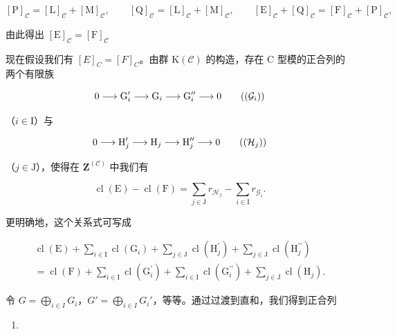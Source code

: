 \[
[ \mathrm{P} ] _ {\mathcal {C}} = [ \mathrm{L} ] _ {\mathcal {C}} + [ \mathrm{M} ] _ {\mathcal {C}}, \qquad [ \mathrm{Q} ] _ {\mathcal {C}} = [ \mathrm{L} ] _ {\mathcal {C}} + [ \mathrm{M} ] _ {\mathcal {C}}, \qquad [ \mathrm{E} ] _ {\mathcal {C}} + [ \mathrm{Q} ] _ {\mathcal {C}} = [ \mathrm{F} ] _ {\mathcal {C}} + [ \mathrm{P} ] _ {\mathcal {C}},
\]

由此得出 \([\mathrm{E}]_{\mathcal{C}} = [\mathrm{F}]_{\mathcal{C}}\)

现在假设我们有 \([E]_{C} = [F]_{C}\)。由群 \(\mathrm{K}(\mathcal{C})\) 的构造，存在 C 型模的正合列的两个有限族

\[
0 \longrightarrow \mathrm{G} _ {i} ^ {\prime} \longrightarrow \mathrm{G} _ {i} \longrightarrow \mathrm{G} _ {i} ^ {\prime \prime} \longrightarrow 0\tag{\((\mathcal{G}_i)\)}
\]

（\(i\in \mathrm{I}\)）与

\[
0 \longrightarrow \mathrm{H} _ {j} ^ {\prime} \longrightarrow \mathrm{H} _ {j} \longrightarrow \mathrm{H} _ {j} ^ {\prime \prime} \longrightarrow 0\tag{\((\mathcal{H}_j)\)}
\]

（\(j\in \mathrm{J}\)），使得在 \(\mathbf{Z}^{(\mathcal{C})}\) 中我们有

\[
\operatorname{cl} (\mathrm{E}) - \operatorname{cl} (\mathrm{F}) = \sum_ {j \in \mathrm{J}} r _ {\mathcal {H} _ {j}} - \sum_ {i \in \mathrm{I}} r _ {\mathcal {G} _ {i}}.
\]

更明确地，这个关系式可写成

\[
\begin{array}{c} \operatorname{cl} (\mathrm{E}) + \sum_ {i \in \mathrm{I}} \operatorname{cl} (\mathrm{G} _ {i}) + \sum_ {j \in \mathrm{J}} \operatorname{cl} (\mathrm{H} _ {j} ^ {\prime}) + \sum_ {j \in \mathrm{J}} \operatorname{cl} (\mathrm{H} _ {j} ^ {\prime \prime}) \\ = \operatorname{cl} (\mathrm{F}) + \sum_ {i \in \mathrm{I}} \operatorname{cl} (\mathrm{G} _ {i} ^ {\prime}) + \sum_ {i \in \mathrm{I}} \operatorname{cl} (\mathrm{G} _ {i} ^ {\prime \prime}) + \sum_ {j \in \mathrm{J}} \operatorname{cl} (\mathrm{H} _ {j}). \end{array}\tag{7}
\]

令 \(G = \bigoplus_{i \in I} G_i\)，\(G' = \bigoplus_{i \in I} G_i'\)，等等。通过过渡到直和，我们得到正合列

\begin{enumerate}
\def\labelenumi{(\Alph{enumi})}
\setcounter{enumi}{6}
\tightlist
\item
\end{enumerate}


